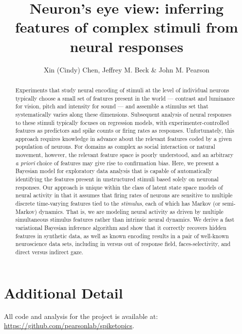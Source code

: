 \documentclass[12pt]{article}
\title{Neuron's eye view: inferring features of complex stimuli from neural responses}
\author{Xin (Cindy) Chen, Jeffrey M. Beck & John M. Pearson}
\date{}
\begin{document}
\maketitle

\begin{abstract}
    Experiments that study neural encoding of stimuli at the level of individual neurons typically choose a small set of features present in the world --- contrast and luminance for vision, pitch and intensity for sound --- and assemble a stimulus set that systematically varies along these dimensions. Subsequent analysis of neural responses to these stimuli typically focuses on regression models, with experimenter-controlled features as predictors and spike counts or firing rates as responses. Unfortunately, this approach requires knowledge in advance about the relevant features coded by a given population of neurons. For domains as complex as social interaction or natural movement, however, the relevant feature space is poorly understood, and an arbitrary \emph{a priori} choice of features may give rise to confirmation bias. Here, we present a Bayesian model for exploratory data analysis that is capable of automatically identifying the features present in unstructured stimuli based solely on neuronal responses. Our approach is unique within the class of latent state space models of neural activity in that it assumes that firing rates of neurons are sensitive to multiple discrete time-varying features tied to the \emph{stimulus}, each of which has Markov (or semi-Markov) dynamics. That is, we are modeling neural activity as driven by multiple simultaneous stimulus features rather than intrinsic neural dynamics.  We derive a fast variational Bayesian inference algorithm and show that it correctly recovers hidden features in synthetic data, as well as known encoding results in a pair of well-known neuroscience data sets, including in versus out of response field, faces-selectivity, and direct versus indirect gaze.
\end{abstract}

\section*{Additional Detail}

All code and analysis for the project is available at: \\ \url{https://github.com/pearsonlab/spiketopics}.

\vspace{5mm}
\end{document}
